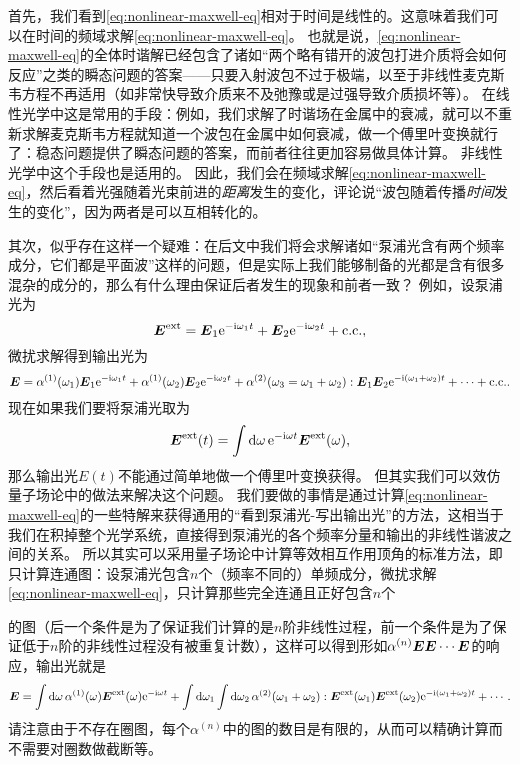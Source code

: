 首先，我们看到\eqref{eq:nonlinear-maxwell-eq}相对于时间是线性的。这意味着我们可以在时间的频域求解\eqref{eq:nonlinear-maxwell-eq}。
也就是说，\eqref{eq:nonlinear-maxwell-eq}的全体时谐解已经包含了诸如“两个略有错开的波包打进介质将会如何反应”之类的瞬态问题的答案——只要入射波包不过于极端，以至于非线性麦克斯韦方程不再适用（如非常快导致介质来不及弛豫或是过强导致介质损坏等）。
在线性光学中这是常用的手段：例如，我们求解了时谐场在金属中的衰减，就可以不重新求解麦克斯韦方程就知道一个波包在金属中如何衰减，做一个傅里叶变换就行了：稳态问题提供了瞬态问题的答案，而前者往往更加容易做具体计算。
非线性光学中这个手段也是适用的。
因此，我们会在频域求解\eqref{eq:nonlinear-maxwell-eq}，然后看着光强随着光束前进的\emph{距离}发生的变化，评论说“波包随着传播\emph{时间}发生的变化”，因为两者是可以互相转化的。

其次，似乎存在这样一个疑难：在后文中我们将会求解诸如“泵浦光含有两个频率成分，它们都是平面波”这样的问题，但是实际上我们能够制备的光都是含有很多混杂的成分的，那么有什么理由保证后者发生的现象和前者一致？
例如，设泵浦光为
\[
    \vb*{E}^\text{ext} = \vb*{E}_1 \mathrm{e}^{-\mathrm{i} \omega_1 t} + \vb*{E}_2 \mathrm{e}^{-\mathrm{i} \omega_2 t} + \text{c.c.},
\]
微扰求解得到输出光为
\[
    \vb*{E} = \alpha^{(1)}(\omega_1) \vb*{E}_1 \mathrm{e}^{-\mathrm{i} \omega_1 t} + \alpha^{(1)}(\omega_2) \vb*{E}_2 \mathrm{e}^{-\mathrm{i} \omega_2 t} + \alpha^{(2)}(\omega_3 = \omega_1 + \omega_2) : \vb*{E}_1 \vb*{E}_2 \mathrm{e}^{-\mathrm{i} (\omega_1 + \omega_2) t} + \cdots + \text{c.c.}.
\]
现在如果我们要将泵浦光取为
\[
    \vb*{E}^\text{ext}(t) = \int \dd{\omega} \mathrm{e}^{-\mathrm{i} \omega t} \vb*{E}^\text{ext}(\omega),
\]
那么输出光$E(t)$不能通过简单地做一个傅里叶变换获得。
但其实我们可以效仿量子场论中的做法来解决这个问题。
我们要做的事情是通过计算\eqref{eq:nonlinear-maxwell-eq}的一些特解来获得通用的“看到泵浦光-写出输出光”的方法，这相当于我们在积掉整个光学系统，直接得到泵浦光的各个频率分量和输出的非线性谐波之间的关系。
所以其实可以采用量子场论中计算等效相互作用顶角的标准方法，即只计算连通图：设泵浦光包含$n$个（频率不同的）单频成分，微扰求解\eqref{eq:nonlinear-maxwell-eq}，只计算那些完全连通且正好包含$n$个的图（后一个条件是为了保证我们计算的是$n$阶非线性过程，前一个条件是为了保证低于$n$阶的非线性过程没有被重复计数），这样可以得到形如$\alpha^{(n)} \vb*{E} \vb*{E} \cdots \vb*{E}$的响应，输出光就是
\[
    \vb*{E} = \int \dd{\omega} \alpha^{(1)}(\omega) \vb*{E}^\text{ext}(\omega) \mathrm{e}^{-\mathrm{i} \omega t} + \int \dd{\omega_1} \int \dd{\omega_2} \alpha^{(2)}(\omega_1 + \omega_2) : \vb*{E}^\text{ext}(\omega_1) \vb*{E}^\text{ext}(\omega_2) \mathrm{e}^{-\mathrm{i} (\omega_1 + \omega_2) t} + \cdots.
\]
请注意由于不存在圈图，每个$\alpha^{(n)}$中的图的数目是有限的，从而可以精确计算而不需要对圈数做截断等。


